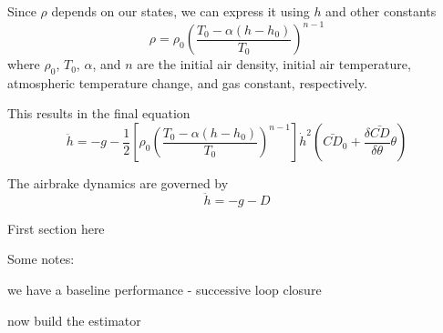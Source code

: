 \documentclass{article}
\begin{document}
  Since $\rho$ depends on our states, we can express it using $h$ and other constants
  \begin{equation}
    \rho = \rho_0 \left(   \frac{T_0 - \alpha\left( h-h_0 \right)}{T_0}   \right)^{n-1}
  \end{equation}
  where $\rho_0$, $T_0$, $\alpha$, and $n$ are the initial air density, initial air temperature, atmospheric temperature change, and gas constant, respectively.

  This results in the final equation
  \begin{equation}
    \ddot{h} = -g -\frac{1}{2} \left[\rho_0 \left(   \frac{T_0 - \alpha\left( h-h_0 \right)}{T_0}   \right)^{n-1}\right] \dot{h}^2 \left(\bar{CD}_0 + \frac{\delta\bar{CD}}{\delta\theta} \theta \right)
  \end{equation}

  The airbrake dynamics are governed by
  \begin{equation}
    \ddot{h} = -g -D
  \end{equation}



  First section here

  Some notes:

  we have a baseline performance - successive loop closure

  now build the estimator
\end{document}
